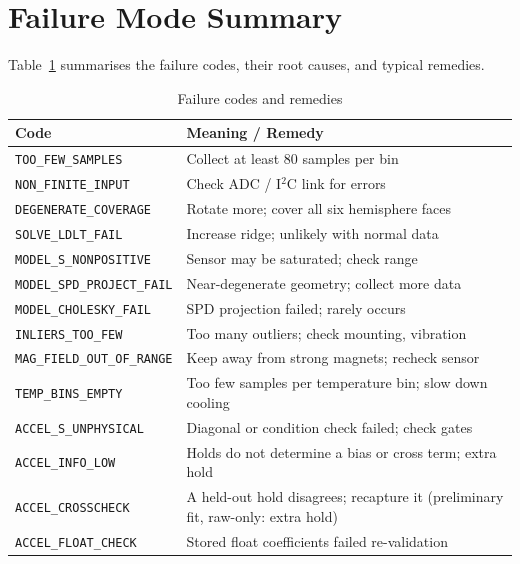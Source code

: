 \documentclass[conference]{IEEEtran}
\begin{document}
    \section{Failure Mode Summary}

    Table~\ref{tab:failures} summarises the failure codes, their root
    causes, and typical remedies.

    \begin{table}[t]
        \centering
        \caption{Failure codes and remedies}
        \label{tab:failures}
        \renewcommand{\arraystretch}{1.2}
        \begin{tabular}{@{}lp{4.2cm}@{}}
            \toprule
            \textbf{Code} & \textbf{Meaning / Remedy} \\
            \midrule
            \texttt{TOO\_FEW\_SAMPLES}      & Collect at least 80 samples per bin \\
            \texttt{NON\_FINITE\_INPUT}     & Check ADC / I$^2$C link for errors \\
            \texttt{DEGENERATE\_COVERAGE}   & Rotate more; cover all six hemisphere faces \\
            \texttt{SOLVE\_LDLT\_FAIL}      & Increase ridge; unlikely with normal data \\
            \texttt{MODEL\_S\_NONPOSITIVE}  & Sensor may be saturated; check range \\
            \texttt{MODEL\_SPD\_PROJECT\_FAIL} & Near-degenerate geometry; collect more data \\
            \texttt{MODEL\_CHOLESKY\_FAIL}  & SPD projection failed; rarely occurs \\
            \texttt{INLIERS\_TOO\_FEW}      & Too many outliers; check mounting, vibration \\
            \texttt{MAG\_FIELD\_OUT\_OF\_RANGE} & Keep away from strong magnets; recheck sensor \\
            \texttt{TEMP\_BINS\_EMPTY}      & Too few samples per temperature bin; slow down cooling \\
            \texttt{ACCEL\_S\_UNPHYSICAL}   & Diagonal or condition check failed; check gates \\
            \texttt{ACCEL\_INFO\_LOW}      & Holds do not determine a bias or cross term; extra hold \\
            \texttt{ACCEL\_CROSSCHECK}     & A held-out hold disagrees; recapture it (preliminary fit, raw-only: extra hold) \\
            \texttt{ACCEL\_FLOAT\_CHECK}   & Stored float coefficients failed re-validation \\
            \bottomrule
        \end{tabular}
    \end{table}
\end{document}
